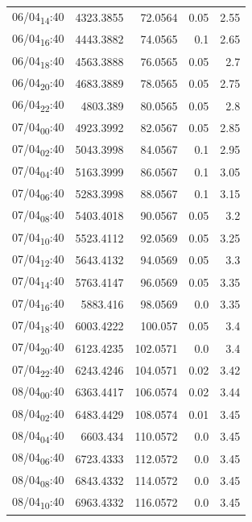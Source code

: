 \documentclass[11pt]{article}
\begin{document}
\begin{center}
\begin{tabular}{lrrrr}
06/04\textsubscript{14}:40 & 4323.3855 & 72.0564 & 0.05 & 2.55\\[0pt]
06/04\textsubscript{16}:40 & 4443.3882 & 74.0565 & 0.1 & 2.65\\[0pt]
06/04\textsubscript{18}:40 & 4563.3888 & 76.0565 & 0.05 & 2.7\\[0pt]
06/04\textsubscript{20}:40 & 4683.3889 & 78.0565 & 0.05 & 2.75\\[0pt]
06/04\textsubscript{22}:40 & 4803.389 & 80.0565 & 0.05 & 2.8\\[0pt]
07/04\textsubscript{00}:40 & 4923.3992 & 82.0567 & 0.05 & 2.85\\[0pt]
07/04\textsubscript{02}:40 & 5043.3998 & 84.0567 & 0.1 & 2.95\\[0pt]
07/04\textsubscript{04}:40 & 5163.3999 & 86.0567 & 0.1 & 3.05\\[0pt]
07/04\textsubscript{06}:40 & 5283.3998 & 88.0567 & 0.1 & 3.15\\[0pt]
07/04\textsubscript{08}:40 & 5403.4018 & 90.0567 & 0.05 & 3.2\\[0pt]
07/04\textsubscript{10}:40 & 5523.4112 & 92.0569 & 0.05 & 3.25\\[0pt]
07/04\textsubscript{12}:40 & 5643.4132 & 94.0569 & 0.05 & 3.3\\[0pt]
07/04\textsubscript{14}:40 & 5763.4147 & 96.0569 & 0.05 & 3.35\\[0pt]
07/04\textsubscript{16}:40 & 5883.416 & 98.0569 & 0.0 & 3.35\\[0pt]
07/04\textsubscript{18}:40 & 6003.4222 & 100.057 & 0.05 & 3.4\\[0pt]
07/04\textsubscript{20}:40 & 6123.4235 & 102.0571 & 0.0 & 3.4\\[0pt]
07/04\textsubscript{22}:40 & 6243.4246 & 104.0571 & 0.02 & 3.42\\[0pt]
08/04\textsubscript{00}:40 & 6363.4417 & 106.0574 & 0.02 & 3.44\\[0pt]
08/04\textsubscript{02}:40 & 6483.4429 & 108.0574 & 0.01 & 3.45\\[0pt]
08/04\textsubscript{04}:40 & 6603.434 & 110.0572 & 0.0 & 3.45\\[0pt]
08/04\textsubscript{06}:40 & 6723.4333 & 112.0572 & 0.0 & 3.45\\[0pt]
08/04\textsubscript{08}:40 & 6843.4332 & 114.0572 & 0.0 & 3.45\\[0pt]
08/04\textsubscript{10}:40 & 6963.4332 & 116.0572 & 0.0 & 3.45\\[0pt]
\end{tabular}
\end{center}
\end{document}
